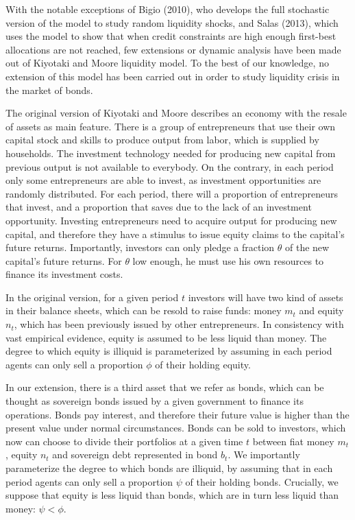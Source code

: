 \documentclass[12pt]{article}%
\begin{document}
With the notable exceptions of Bigio (2010), who develops the full stochastic version
of the model to study random liquidity shocks, and Salas (2013), which
uses the model to show that when credit constraints are high enough first-best allocations are not
reached, few extensions or dynamic analysis have been made out of Kiyotaki and Moore liquidity model.
To the best of our knowledge, no extension of this model has been carried out in
order to study liquidity crisis in the market of bonds. 

The original version of Kiyotaki and Moore describes an economy with the resale
of assets as main feature. There is a group of entrepreneurs that use their own
capital stock and skills to produce output from labor, which is supplied by
households. The investment technology needed for producing new capital from
previous output is not available to everybody. On the contrary, in each period
only some entrepreneurs are able to invest, as investment opportunities are
randomly distributed. For each period, there will a proportion of entrepreneurs
that invest, and a proportion that saves due to the lack of an investment
opportunity. Investing entrepreneurs need to acquire output for producing new
capital, and therefore they have a stimulus to issue equity claims to the
capital's future returns. Importantly, investors can only pledge a fraction
$\theta$ of the new capital's future returns. For $\theta$ low enough, he must
use his own resources to finance its investment costs.

In the original version, for a given period $t$ investors will have two kind of
assets in their balance sheets, which can be resold to raise funds: money $m_t$
and equity $n_{t}$, which has been previously issued by other entrepreneurs. In
consistency with vast empirical evidence, equity is assumed to be less liquid
than money. The degree to which equity is illiquid is parameterized by assuming in
each period agents can only sell a proportion $\phi$ of their holding equity.

In our extension, there is a third asset that we refer as bonds, which can be
thought as sovereign bonds issued by a given government to finance its
operations. Bonds pay interest, and therefore their future
value is higher than the present value under normal circumstances. Bonds can be
sold to investors, which now can choose to divide their portfolios at a given time $t$
between fiat money $m_t$, equity $n_{t}$ and sovereign debt represented in bond
$b_{t}$. We importantly parameterize the degree to which bonds are illiquid, by
assuming that in each period agents can only sell a proportion $\psi$ of their
holding bonds. Crucially, we suppose that equity is less liquid than bonds,
which are in turn less liquid than money: $\psi < \phi$.
\end{document}
